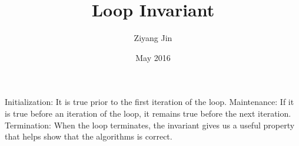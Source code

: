 \documentclass{article}
\title{Loop Invariant}
\author{Ziyang Jin}
\date{May 2016}
\begin{document}
Initialization: 
  It is true prior to the first iteration of the loop.
Maintenance: 
  If it is true before an iteration of the loop, it remains true before the next iteration.
Termination: 
  When the loop terminates, the invariant gives us a useful property that helps show that the algorithms is correct.
\end{document}
